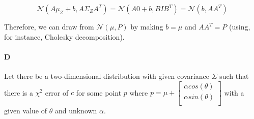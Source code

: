 \documentclass[12pt]{article}
\begin{document}
\[
\mathcal{N}\left(A\mu_Z + b, A\Sigma_Z A^T\right) = \mathcal{N}\left(A0 + b, BIB^T\right) = \mathcal{N}\left(b, AA^T\right)
\]

Therefore, we can draw from $\mathcal{N}\left(\mu,P\right)$ by making $b=\mu$ and $AA^T=P$ (using, for instance, Cholesky decomposition).

\paragraph{D}
Let there be a two-dimensional distribution with given covariance $\Sigma$ such that there is a $\chi^2$ error of $c$ for some point $p$ where $p = \mu +
\left[ {\begin{smallmatrix}
\alpha cos(\theta)  \\
\alpha sin(\theta)  \\
 \end{smallmatrix} } \right]$
with a given value of $\theta$ and unknown $\alpha$.
\end{document}
